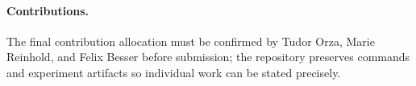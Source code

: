 \documentclass[10pt,a4paper]{article}
\begin{document}
\paragraph{Contributions.}
The final contribution allocation must be confirmed by Tudor Orza, Marie
Reinhold, and Felix Besser before submission; the repository preserves commands
and experiment artifacts so individual work can be stated precisely.



\end{document}
